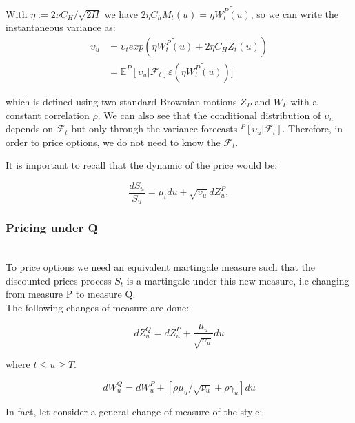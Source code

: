 \documentclass[12pt,oneside]{article}
\begin{document}
With $\eta := 2 \nu C_{H}/ \sqrt{2H}$ we have $2\eta C_{h} M_{t}(u) = \eta \tilde{W_{t}^{P}(u)}$, so we can write the instantaneous variance as:
\begin{equation}
\label{eq:volunderP}
\begin{split}
    \upsilon_{u} & = \upsilon_{t} exp (\eta \tilde{W_{t}^{P}(u)} + 2\eta C_{H} Z_{t}(u)) \\
    & = \mathbb{E}^{P} [\upsilon_{u}| \mathcal{F}_{t}] \varepsilon (\eta \tilde{W_{t}^{P}(u)})]
\end{split}
\end{equation}
 
 which is defined using two standard Brownian motions $Z_{P}$ and $W_{P}$ with a constant correlation $\rho$. We can also see that the conditional distribution of $\upsilon_{u}$ depends on $\mathcal{F}_{t}$ but only through the variance forecasts $^{P} [\upsilon_{u}| \mathcal{F}_{t}]$. Therefore, in order to price options, we do not need to know the $\mathcal{F}_{t}$.

It is important to recall that the dynamic of the price would be:

\begin{equation}
     \frac{dS_{u}}{S_{u}} = \mu_{t} du + \sqrt{\upsilon_{u}}dZ_{u}^{P},
\end{equation}

\subsubsection{Pricing under Q}
\\

To price options we need an equivalent martingale measure such that the discounted prices process $S_{t}$ is a martingale under this new measure, i.e changing from measure P to measure Q.
\\

The following changes of measure are done:

\begin{equation}
    dZ_{u}^{Q} = dZ_{u}^{P} + \frac{\mu_{u}}{\sqrt{\upsilon_{u}}}du
\end{equation}

where $ t \leq u \geq T$.

\begin{equation}
    dW_{u}^{Q} = dW_{u}^{P} + [\rho \mu_{u} / \sqrt{\nu_{u}} + \rho \gamma_{u}] du
\end{equation}

In fact, let consider a general change of measure of the style:
\end{document}

